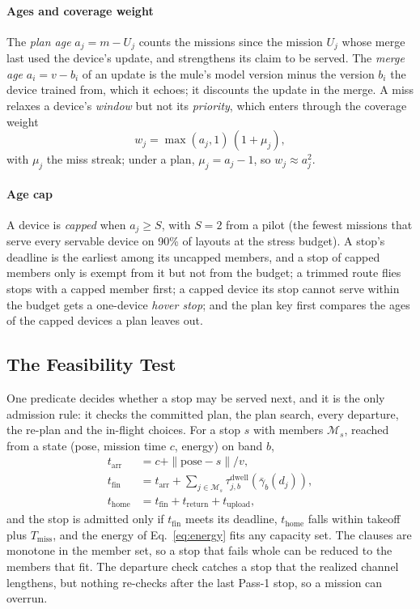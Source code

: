 \documentclass[conference]{IEEEtran}
\begin{document}
\paragraph{Ages and coverage weight}
The \emph{plan age} $a_j=m-U_j$ counts the missions since the mission $U_j$ whose
merge last used the device's update, and strengthens its claim to be served. The
\emph{merge age} $a_i=v-b_i$ of an update is the mule's model version minus the
version $b_i$ the device trained from, which it echoes; it discounts the update
in the merge. A miss relaxes a device's \emph{window} but not its
\emph{priority}, which enters through the coverage weight
\begin{equation}
w_j=\max(a_j,1)\,(1+\mu_j),
\label{eq:covweight}
\end{equation}
with $\mu_j$ the miss streak; under a plan, $\mu_j=a_j-1$, so $w_j\approx a_j^2$.

\paragraph{Age cap}
A device is \emph{capped} when $a_j\ge S$, with $S=2$ from a pilot (the fewest
missions that serve every servable device on 90\% of layouts at the stress
budget). A stop's deadline is the earliest among its uncapped members, and a
stop of capped members only is exempt from it but not from the budget; a trimmed
route flies stops with a capped member first; a capped device its stop cannot
serve within the budget gets a one-device \emph{hover stop}; and the plan key
first compares the ages of the capped devices a plan leaves out.

\subsection{The Feasibility Test}
\label{sec:method:gate}

One predicate decides whether a stop may be served next, and it is the only
admission rule: it checks the committed plan, the plan search, every departure,
the re-plan and the in-flight choices. For a stop $s$ with members
$\mathcal{M}_s$, reached from a state (pose, mission time $c$, energy) on band $b$,
\begin{align}
t_{\mathrm{arr}} &= c+\|\mathrm{pose}-s\|/v,\\
t_{\mathrm{fin}} &= t_{\mathrm{arr}}+\!\!\sum_{j\in\mathcal{M}_s}\!\tau^{\mathrm{dwell}}_{j,b}(\bar\gamma_b(d_j)),\\
t_{\mathrm{home}} &= t_{\mathrm{fin}}+t_{\mathrm{return}}+t_{\mathrm{upload}},
\end{align}
and the stop is admitted only if $t_{\mathrm{fin}}$ meets its deadline,
$t_{\mathrm{home}}$ falls within takeoff plus $T_{\mathrm{miss}}$, and the energy
of Eq.~\eqref{eq:energy} fits any capacity set. The clauses are monotone in the
member set, so a stop that fails whole can be reduced to the members that fit.
The departure check catches a stop that the realized channel lengthens, but
nothing re-checks after the last Pass-1 stop, so a mission can overrun.
\end{document}
